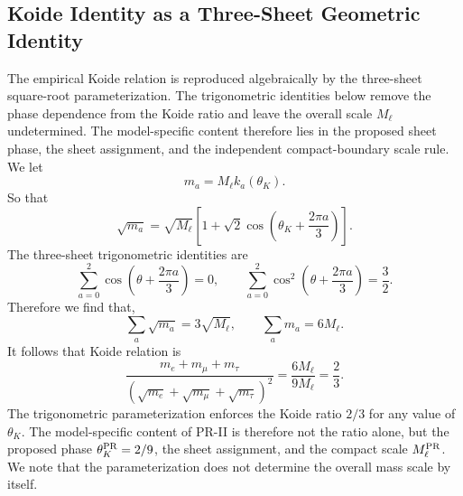 \documentclass[11pt]{article}
\begin{document}
\subsection{Koide Identity as a Three-Sheet Geometric Identity}
\label{sec:pr2_koide_identity_three_sheet_geometry}
The empirical Koide relation \cite{Koide1983,Koide1983Erratum} is reproduced algebraically by the three-sheet square-root parameterization. The trigonometric identities below remove the phase dependence from the Koide ratio and leave the overall scale \(M_\ell\) undetermined. The model-specific content therefore lies in the proposed sheet phase, the sheet assignment, and the independent compact-boundary scale rule. We let
\begin{equation}
m_a
=
M_\ell k_a(\theta_K).
\end{equation}
So that
\begin{equation}
\sqrt{m_a}
=
\sqrt{M_\ell}
\left[
1+\sqrt2\cos
\left(
\theta_K+\frac{2\pi a}{3}
\right)
\right].
\end{equation}
The three-sheet trigonometric identities are
\begin{equation}
\sum_{a=0}^{2}
\cos
\left(
\theta+\frac{2\pi a}{3}
\right)
=0,
\qquad
\sum_{a=0}^{2}
\cos^2
\left(
\theta+\frac{2\pi a}{3}
\right)
=
\frac32.
\end{equation}
Therefore we find that,
\begin{equation}
\sum_a\sqrt{m_a}
=
3\sqrt{M_\ell},
\qquad
\sum_a m_a
=
6M_\ell.
\end{equation}
It follows that Koide relation is
\begin{equation}
\boxed{
\frac{
m_e+m_\mu+m_\tau
}{
\left(
\sqrt{m_e}
+
\sqrt{m_\mu}
+
\sqrt{m_\tau}
\right)^2
}
=
\frac{
6M_\ell
}{
9M_\ell
}
=
\frac23.
}
\end{equation}
The trigonometric parameterization enforces the Koide ratio \(2/3\) for any value of \(\theta_K\). The model-specific content of PR-II is therefore not the ratio alone, but the proposed phase \(\theta_K^{\rm PR}=2/9\), the sheet assignment, and the compact scale \(M_\ell^{\rm PR}\). We note that the parameterization does not determine the overall
mass scale by itself.
\end{document}
